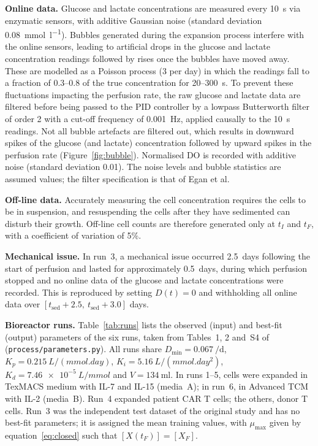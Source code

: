 \documentclass[11pt,a4paper]{article}
\newcommand{\code}[1]{\texttt{#1}}
\newcommand{\tsed}{t_{\mathrm{sed}}}
\newcommand{\mumax}{\mu_{\max}}
\begin{document}
\textbf{Online data.} Glucose and lactate concentrations are measured every \SI{10}{\second} via
enzymatic sensors, with additive Gaussian noise (standard deviation \SI{0.08}{\milli\mole\per\litre}).
Bubbles generated during the expansion process interfere with the online sensors, leading to
artificial drops in the glucose and lactate concentration readings followed by rises once the bubbles
have moved away. These are modelled as a Poisson process (3 per day) in which the readings fall to a
fraction of 0.3--0.8 of the true concentration for 20--\SI{300}{\second}. To prevent these
fluctuations impacting the perfusion rate, the raw glucose and lactate data are filtered before being
passed to the PID controller by a lowpass Butterworth filter of order 2 with a cut-off frequency of
\SI{0.001}{\hertz}, applied causally to the \SI{10}{\second} readings. Not all bubble artefacts are
filtered out, which results in downward spikes of the glucose (and lactate) concentration followed
by upward spikes in the perfusion rate (Figure~\ref{fig:bubble}). Normalised DO is recorded with
additive noise (standard deviation 0.01). The noise levels and bubble statistics are assumed values;
the filter specification is that of Egan et al.

\textbf{Off-line data.} Accurately measuring the cell concentration requires the cells to be in
suspension, and resuspending the cells after they have sedimented can disturb their growth.
Off-line cell counts are therefore generated only at $t_I$ and $t_F$, with a coefficient of variation
of 5\%.

\textbf{Mechanical issue.} In run~3, a mechanical issue occurred 2.5~days following the start of
perfusion and lasted for approximately 0.5~days, during which perfusion stopped and no online data of
the glucose and lactate concentrations were recorded. This is reproduced by setting $D(t)=0$ and
withholding all online data over $[\tsed+2.5,\ \tsed+3.0]$ days.

\textbf{Bioreactor runs.} Table~\ref{tab:runs} lists the observed (input) and best-fit (output)
parameters of the six runs, taken from Tables~1, 2 and~S4 of \cite{egan2025}
(\code{process/parameters.py}). All runs share $D_{\min}=\SI{0.067}{\per\day}$,
$K_p = \SI{0.215}{L\per(mmol.day)}$, $K_i = \SI{5.16}{L\per(mmol.day^2)}$,
$K_d = \SI{7.46e-5}{L\per mmol}$ and $V = \SI{134}{\milli\litre}$. In runs 1--5, cells were expanded in
TexMACS medium with IL-7 and IL-15 (media~A); in run~6, in Advanced TCM with IL-2 (media~B). Run~4
expanded patient CAR T cells; the others, donor T cells. Run~3 was the independent test dataset of
the original study and has no best-fit parameters; it is assigned the mean training values, with
$\mumax$ given by equation~\eqref{eq:closed} such that $[X(t_F)]=[X_F]$.
\end{document}
